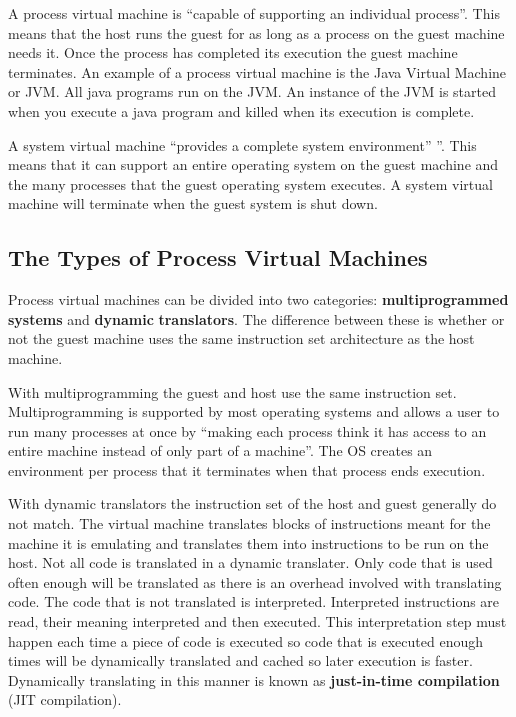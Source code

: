 \documentclass[english,a4paper]{article}
\begin{document}
A process virtual machine is ``capable of supporting an individual
process''\cite[pg9]{JamesE.Smith2005}. This means that the host runs
the guest for as long as a process on the guest machine needs it. Once
the process has completed its execution the guest machine
terminates\cite[pg9]{JamesE.Smith2005}. An example of a process
virtual machine is the Java Virtual Machine or JVM. All java programs
run on the JVM. An instance of the JVM is started when you execute a
java program and killed when its execution is complete.

A system virtual machine ``provides a complete system environment''
''\cite[pg9]{JamesE.Smith2005}. This means that it can support an
entire operating system on the guest machine and the many processes
that the guest operating system executes. A system virtual machine
will terminate when the guest system is shut down.

\subsection{The Types of Process Virtual Machines}

Process virtual machines can be divided into two categories:
\textbf{multiprogrammed systems} and \textbf{dynamic}
\textbf{translators}. The difference between these is whether or not the
guest machine uses the same instruction set architecture as the host
machine.

With multiprogramming the guest and host use the same instruction
set. Multiprogramming is supported by most operating systems and
allows a user to run many processes at once by ``making each process
think it has access to an entire machine instead of only part of a
machine''\cite[pg13]{JamesE.Smith2005}. The OS creates an environment
per process that it terminates when that process ends execution.

With dynamic translators the instruction set of the host and guest
generally do not match. The virtual machine translates blocks of
instructions meant for the machine it is emulating and translates them
into instructions to be run on the host. Not all code is translated in
a dynamic translater. Only code that is used often enough will be
translated as there is an overhead involved with translating code. The
code that is not translated is interpreted. Interpreted instructions
are read, their meaning interpreted and then executed. This
interpretation step must happen each time a piece of code is executed
so code that is executed enough times will be dynamically translated
and cached so later execution is faster. Dynamically translating in
this manner is known as \textbf{just-in-time compilation} (JIT
compilation).
\end{document}
